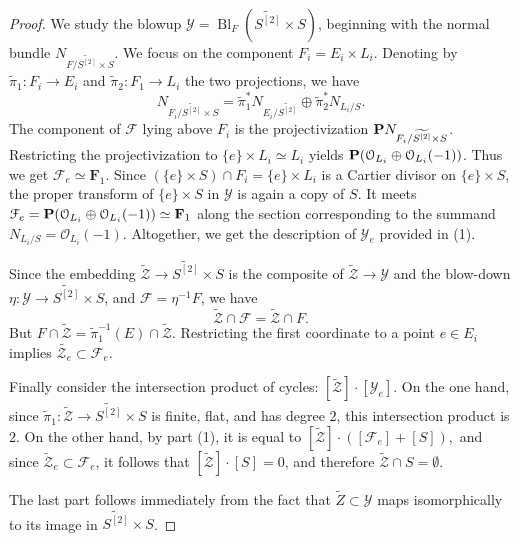 \documentclass[12pt,reqno]{amsart}
\DeclareMathOperator{\Bl}{Bl}
\renewcommand{\to}{{\longrightarrow}}
\numberwithin{equation}{section}
\renewcommand{\O}{\mathcal O}
\newcommand{\F}{\mathbf F}
\newcommand{\td}{\widetilde}
\begin{document}
\begin{proof}
  We study the blowup $\mathcal{Y} = \Bl_{F} \left( \td{S^{[2]}} \times S
  \right)$, beginning with the normal bundle $N_{F/ \td{S^{[2]}} \times S }$.
  We focus on the component $F_{i} = E_{i} \times L_{i}$.
  Denoting by $\widetilde{\pi}_1 \colon F_i \to E_i$ and $\widetilde{\pi}_2 \colon F_1 \to L_i$ the two projections, we have
  \[N_{F_{i}/ \td{S^{[2]}} \times S } = \td{\pi}_{1}^{*}
    N_{E_{i}/\td{S^{[2]}}} \oplus \td{\pi}_{2}^{*}N_{L_{i}/S}.\]
  The component of $\mathcal{F}$ lying above $F_{i}$ is the
  projectivization $\P N_{F_{i}/ \td{S^{[2]}} \times S }$.
  Restricting the projectivization to $\{e\} \times L_{i} \simeq L_i$ yields
  $\P (\O_{L_{i}} \oplus \O_{L_{i}}(-1))$.
  Thus we get  $\mathcal{F}_{e} \simeq \F_{1}$.
  Since $(\{e\} \times S) \cap F_{i} = \{e\} \times L_{i}$ is a Cartier
  divisor on $\{e\} \times S$, the proper transform of $\{e\} \times S$ in
  $\mathcal{Y}$ is again a copy of $S$.
  It meets
  $\mathcal{F}_{e} = \P (\O_{L_{i}} \oplus \O_{L_{i}}(-1)) \simeq
  \F_{1}$ along the section corresponding to the summand
  $N_{L_{i}/S} = \O_{L_{i}}(-1)$.
  Altogether, we get the description of $\mathcal{Y}_{e}$ provided in (1).

  Since the embedding $\widetilde {\mathcal Z} \to \widetilde{S^{[2]}} \times S$ is the composite of $\widetilde {\mathcal Z} \to \mathcal Y$ and the blow-down $\eta \colon \mathcal Y \to \widetilde{S^{[2]}} \times S$, and $\mathcal F = \eta^{-1}F$, we have
  \[ \widetilde {\mathcal Z} \cap \mathcal F = \widetilde {\mathcal Z} \cap F.\]
  But $F \cap \td{\mathcal{Z}} = \td{\pi}_{1}^{-1}(E) \cap
  \td{\mathcal{Z}}$.
  Restricting the first coordinate to a point $e \in E_i$ implies
  $\td{\mathcal{Z}_{e}} \subset \mathcal{F}_{e}$.

  Finally consider
the intersection product of cycles:
$[\td{\mathcal{Z}}] \cdot [\mathcal{Y}_{e}]$.  On the one hand, since
$\td{\pi}_{1}: \td{\mathcal{Z}} \to \td{S^{[2]}} \times S$ is finite,
flat, and has degree $2$, this intersection product is $2$.  On the
other hand, by part (1), it is equal to
$[\td{\mathcal{Z}}] \cdot ([\mathcal{F}_{e}]+ [S]),$ and since
$\td{\mathcal{Z}}_{e} \subset \mathcal{F}_{e}$, it follows that
$[\td{\mathcal{Z}}] \cdot [S] = 0$, and therefore
$\td{\mathcal{Z}} \cap S = \emptyset$.

The last part follows immediately from the fact that $\widetilde Z \subset \mathcal Y$ maps isomorphically to its image in $\widetilde{S^{[2]}} \times S$.
\end{proof}
\end{document}
